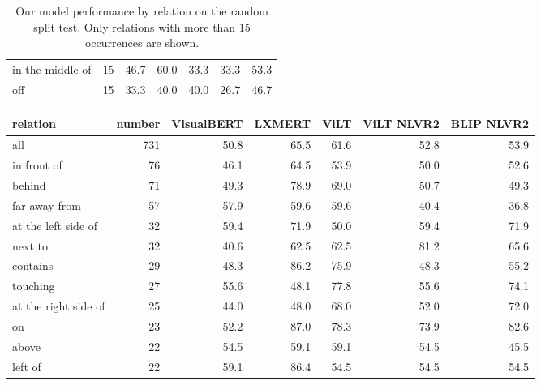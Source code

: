 \begin{table}[ht]
\begin{adjustbox}{max width=0.7\textwidth}
\begin{tabular}{lrrrrrr}
in the middle of     &      15 &        46.7 &    60.0 &  33.3 &        33.3 &        53.3 \\
off                  &      15 &        33.3 &    40.0 &  40.0 &        26.7 &        46.7 \\
\bottomrule
\end{tabular}
\end{adjustbox}
\caption{Our model performance by relation on the random split test. Only relations with more than 15 occurrences are shown.}
\label{tab:results-by-relation-random}
\end{table}

\begin{table}[ht]
\centering
\begin{adjustbox}{max width=0.7\textwidth}
\begin{tabular}{lrrrrrr}
\toprule
relation &  number &  VisualBERT &  LXMERT &  ViLT &  ViLT NLVR2 &  BLIP NLVR2 \\
\midrule
all                  &     731 &        50.8 &    65.5 &  61.6 &        52.8 &        53.9 \\
\midrule
in front of          &      76 &        46.1 &    64.5 &  53.9 &        50.0 &        52.6 \\
behind               &      71 &        49.3 &    78.9 &  69.0 &        50.7 &        49.3 \\
far away from        &      57 &        57.9 &    59.6 &  59.6 &        40.4 &        36.8 \\
at the left side of  &      32 &        59.4 &    71.9 &  50.0 &        59.4 &        71.9 \\
next to              &      32 &        40.6 &    62.5 &  62.5 &        81.2 &        65.6 \\
contains             &      29 &        48.3 &    86.2 &  75.9 &        48.3 &        55.2 \\
touching             &      27 &        55.6 &    48.1 &  77.8 &        55.6 &        74.1 \\
at the right side of &      25 &        44.0 &    48.0 &  68.0 &        52.0 &        72.0 \\
on                   &      23 &        52.2 &    87.0 &  78.3 &        73.9 &        82.6 \\
above                &      22 &        54.5 &    59.1 &  59.1 &        54.5 &        45.5 \\
left of              &      22 &        59.1 &    86.4 &  54.5 &        54.5 &        54.5 \\

\end{tabular}
\end{adjustbox}
\end{table}
